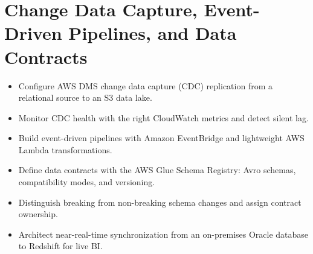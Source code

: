 \chapter{Change Data Capture, Event-Driven Pipelines, and Data Contracts}
%
\begin{objectives}
\begin{itemize}
    \item Configure AWS DMS change data capture (CDC) replication from a relational source to an S3 data lake.
    \item Monitor CDC health with the right CloudWatch metrics and detect silent lag.
    \item Build event-driven pipelines with Amazon EventBridge and lightweight AWS Lambda transformations.
    \item Define data contracts with the AWS Glue Schema Registry: Avro schemas, compatibility modes, and versioning.
    \item Distinguish breaking from non-breaking schema changes and assign contract ownership.
    \item Architect near-real-time synchronization from an on-premises Oracle database to Redshift for live BI.
\end{itemize}
\end{objectives}

